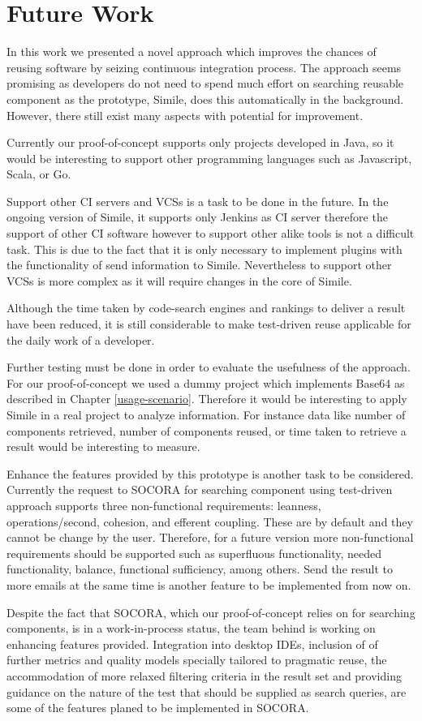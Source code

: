 \chapter{Future Work}
\label{future-work}
In this work we presented a novel approach which improves the chances of reusing software by seizing continuous integration process. The approach seems promising as developers do not need to spend much effort on searching reusable component as the prototype, Simile, does this automatically in the background. However, there still exist many aspects with potential for improvement.

Currently our proof-of-concept supports only projects developed in Java, so it would be interesting to support other programming languages such as Javascript, Scala, or Go. 

Support other CI servers and VCSs is a task to be done in the future. In the ongoing version of Simile, it supports only Jenkins as CI server therefore the support of other CI software however to support other alike tools is not a difficult task. This is due to the fact that it is only necessary to implement plugins with the functionality of send information to Simile. Nevertheless to support other VCSs is more complex as it will require changes in the core of Simile.

Although the time taken by code-search engines and rankings to deliver a result have been reduced, it is still considerable to make test-driven reuse applicable for the daily work of a developer.

Further testing must be done in order to evaluate the usefulness of the approach. For our proof-of-concept we used a dummy project which implements Base64 as described in Chapter \ref{usage-scenario}. Therefore it would be interesting to apply Simile in a real project to analyze information. For instance data like number of components retrieved, number of components reused, or time taken to retrieve a result would be interesting to measure.

Enhance the features provided by this prototype is another task to be considered. Currently the request to SOCORA for searching component using test-driven approach supports three non-functional requirements: leanness, operations/second, cohesion, and efferent coupling. These are by default and they cannot be change by the user. Therefore, for a future version more non-functional requirements should be supported such as superfluous functionality, needed functionality, balance, functional sufficiency, among others. Send the result to more emails at the same time is another feature to be implemented from now on.

Despite the fact that SOCORA, which our proof-of-concept relies on for searching components, is in a work-in-process status, the team behind is working on enhancing features provided. Integration into desktop IDEs, inclusion of of further metrics and quality models specially tailored to pragmatic reuse, the accommodation of more relaxed filtering criteria in the result set and providing guidance on the nature of the test that should be supplied as search queries, are some of the features planed to be implemented in SOCORA\cite{Kessel2016}.